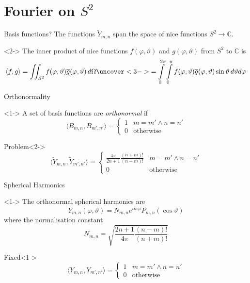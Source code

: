 \documentclass[xetex, onlymath, aspectratio=169]{beamer}
\begin{document}
\section{Fourier on \(S^2\)}

\begin{frame}{Basis functions?}
	The functions \(\tilde{Y}_{m, n}\) span the space of nice functions \(S^2 \to \mathbb{C}\).
	
	\begin{definition}<2->
		The inner product of nice functions \(f(\varphi, \vartheta)\) and \(g(\varphi, \vartheta)\) from \(S^2\) to \(\mathbb{C}\) is
		\[
			\langle f, g \rangle
				= \iint_{S^2} f(\varphi, \vartheta) \overline{g}(\varphi, \vartheta) \, d\Omega
				\uncover<3->{
  				= \int\limits_0^{2\pi} \int\limits_0^{\pi}
  					f(\varphi, \vartheta) \overline{g}(\varphi, \vartheta)
  					\sin\vartheta \, d\vartheta d\varphi
				}
		\]
	\end{definition}
\end{frame}

\begin{frame}{Orthonormality}
	\begin{definition}<1->
		A set of basis functions are \emph{orthonormal} if
		\[
			\langle B_{m, n}, B_{m', n'} \rangle = \begin{cases}
				1 & m = m' \wedge n = n' \\
				0 & \text{otherwise}
			\end{cases}
		\]
	\end{definition}

	\begin{alertblock}{Problem}<2->
  	\[
  		\langle \tilde{Y}_{m, n}, \tilde{Y}_{m', n'} \rangle = \begin{cases} \displaystyle
  			\frac{4 \pi}{2n+1} \frac{(n+m)!}{(n-m)!} &  m = m' \wedge n = n' \\
  			0 & \text{otherwise}
  		\end{cases}
  	\]
	\end{alertblock}
\end{frame}

\begin{frame}{Spherical Harmonics}
	\begin{definition}<1->
		The orthonormal spherical harmonics are
		\[
			Y_{m, n}(\varphi, \vartheta) = N_{m, n} e^{im\varphi} P_{m, n}(\cos\vartheta)
		\]
		where the normalisation constant
		\[
			N_{m, n} = \sqrt{\frac{2n+1}{4 \pi} \frac{(n-m)!}{(n+m)!}}
		\]
	\end{definition}
	\begin{alertblock}{Fixed}<1->
		\[
			\langle Y_{m, n}, Y_{m', n'} \rangle = \begin{cases}
				1 & m = m' \wedge n = n' \\
				0 & \text{otherwise}
			\end{cases}
		\]
	\end{alertblock}
\end{frame}
\end{document}
